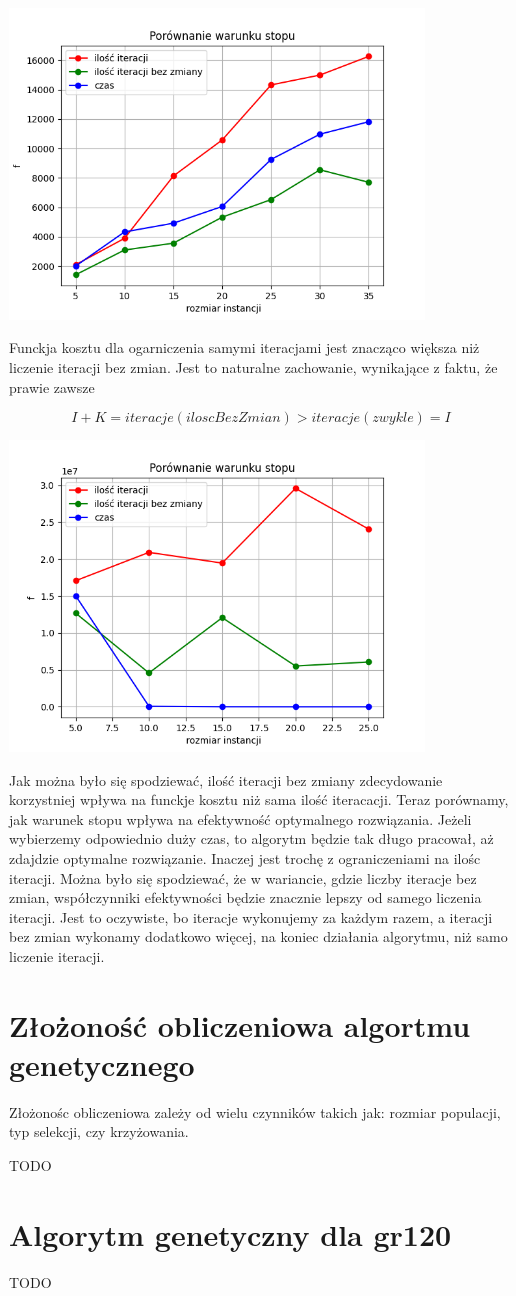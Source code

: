 \documentclass{article}
\begin{document}
    \includegraphics[width=11cm]{./spr2img/Figure_8.png}

    Funckja kosztu dla ogarniczenia samymi iteracjami jest znacząco większa niż liczenie
    iteracji bez zmian. Jest to naturalne zachowanie, wynikające z faktu, że prawie zawsze

    $$I + K = iteracje(iloscBezZmian) > iteracje(zwykle) = I$$

    \includegraphics[width=11cm]{./spr2img/Figure_10.png}

    Jak można było się spodziewać, ilość iteracji bez zmiany zdecydowanie korzystniej
    wpływa na funckje kosztu niż sama ilość iteracacji. Teraz porównamy, jak
    warunek stopu wpływa na efektywność optymalnego rozwiązania. Jeżeli wybierzemy odpowiednio duży czas,
    to algorytm będzie tak długo pracował, aż zdajdzie optymalne rozwiązanie. Inaczej jest trochę
    z ograniczeniami na ilośc iteracji. Można było się spodziewać, że w wariancie, gdzie liczby iteracje
    bez zmian, współczynniki  efektywności będzie znacznie lepszy od samego liczenia iteracji.
    Jest to oczywiste, bo iteracje wykonujemy za każdym razem, a iteracji bez zmian wykonamy dodatkowo więcej,
    na koniec działania algorytmu, niż samo liczenie iteracji.

    \section{Złożoność obliczeniowa algortmu genetycznego}

    Złożonośc obliczeniowa zależy od wielu czynników takich jak:
    rozmiar populacji, typ selekcji, czy krzyżowania.

    TODO

    \section{Algorytm genetyczny dla gr120}

    TODO
\end{document}
